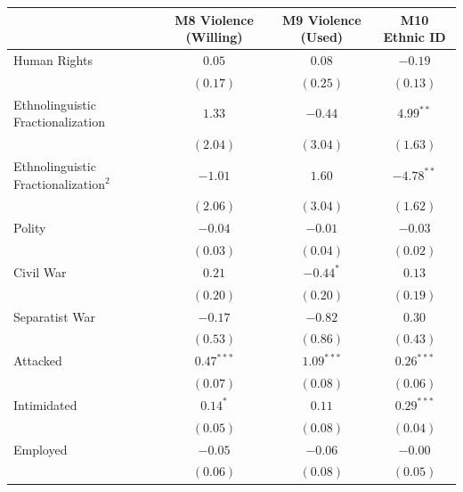 \documentclass[12pt,]{book}
\let\origtable\table
\let\endorigtable\endtable
\renewenvironment{table}[1][2] {
    \singlespacing
    \expandafter\origtable\expandafter[H]
} {
    \endorigtable
}
\theoremstyle{definition}
\theoremstyle{definition}
\theoremstyle{definition}
\theoremstyle{remark}
\begin{document}
\begin{table}
\begin{center}
\begin{tabular}{l c c c }
\hline
 & M8 Violence (Willing) & M9 Violence (Used) & M10 Ethnic ID \\
\hline
Human Rights                            & $0.05$        & $0.08$        & $-0.19$       \\
                                        & $(0.17)$      & $(0.25)$      & $(0.13)$      \\
Ethnolinguistic Fractionalization       & $1.33$        & $-0.44$       & $4.99^{**}$   \\
                                        & $(2.04)$      & $(3.04)$      & $(1.63)$      \\
Ethnolinguistic Fractionalization$^{2}$ & $-1.01$       & $1.60$        & $-4.78^{**}$  \\
                                        & $(2.06)$      & $(3.04)$      & $(1.62)$      \\
Polity                                  & $-0.04$       & $-0.01$       & $-0.03$       \\
                                        & $(0.03)$      & $(0.04)$      & $(0.02)$      \\
Civil War                               & $0.21$        & $-0.44^{*}$   & $0.13$        \\
                                        & $(0.20)$      & $(0.20)$      & $(0.19)$      \\
Separatist War                          & $-0.17$       & $-0.82$       & $0.30$        \\
                                        & $(0.53)$      & $(0.86)$      & $(0.43)$      \\
Attacked                                & $0.47^{***}$  & $1.09^{***}$  & $0.26^{***}$  \\
                                        & $(0.07)$      & $(0.08)$      & $(0.06)$      \\
Intimidated                             & $0.14^{*}$    & $0.11$        & $0.29^{***}$  \\
                                        & $(0.05)$      & $(0.08)$      & $(0.04)$      \\
Employed                                & $-0.05$       & $-0.06$       & $-0.00$       \\
                                        & $(0.06)$      & $(0.08)$      & $(0.05)$      \\

\end{tabular}
\end{center}
\end{table}
\end{document}
